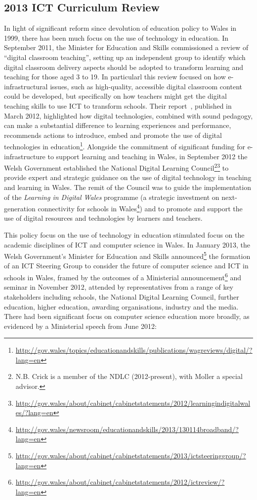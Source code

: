 \documentclass{sig-alternate}
\begin{document}
\subsection{2013 ICT Curriculum Review}


In light of significant reform since devolution of education policy to
Wales in 1999, there has been much focus on the use of technology in
education. In September 2011, the Minister for Education and Skills
commissioned a review of ``digital classroom teaching'', setting up an
independent group to identify which digital classroom delivery aspects
should be adopted to transform learning and teaching for those aged 3
to 19. In particularl this review focused on how e-infrastructural
issues, such as high-quality, accessible digital classroom content
could be developed, but specifically on how teachers might get the
digital teaching skills to use ICT to transform schools. Their
report~\cite{haywarddigwales:2012}, published in March 2012,
highlighted how digital technologies, combined with sound pedagogy,
can make a substantial difference to learning experiences and
performance, recommends actions to introduce, embed and promote the
use of digital technologies in
education\footnote{\url{http://gov.wales/topics/educationandskills/publications/wagreviews/digital/?lang=en}}. Alongside
the commitment of significant funding for e-infrastructure to support
learning and teaching in Wales, in September 2012 the Welsh Government
established the National Digital Learning Council\footnote{N.B. Crick
is a member of the NDLC (2012-present), with Moller a special
advisor.}\footnote{\url{http://gov.wales/about/cabinet/cabinetstatements/2012/learningindigitalwales/?lang=en}}
to provide expert and strategic guidance on the use of digital
technology in teaching and learning in Wales.  The remit of the
Council was to guide the implementation of the {\emph{Learning in
Digital Wales}} programme (a strategic investment on next-generation
connectivity for schools in
Wales\footnote{\url{http://gov.wales/newsroom/educationandskills/2013/130114broadband/?lang=en}})
and to promote and support the use of digital resources and
technologies by learners and teachers.


This policy focus on the use of technology in education stimulated
focus on the academic disciplines of ICT and computer science in
Wales. In January 2013, the Welsh Government's Minister for Education
and Skills
announced\footnote{\url{http://gov.wales/about/cabinet/cabinetstatements/2013/ictsteeringgroup/?lang=en}}
the formation of an ICT Steering Group to consider the future of
computer science and ICT in schools in Wales, framed by the outcomes
of a Ministerial
announcement\footnote{\url{http://gov.wales/about/cabinet/cabinetstatements/2012/ictreview/?lang=en}}
and seminar in November 2012, attended by representatives from a range
of key stakeholders including schools, the National Digital Learning
Council, further education, higher education, awarding organisations,
industry and the media. There had been significant focus on computer
science education more broadly, as evidenced by a Ministerial speech
from June 2012:
\end{document}
